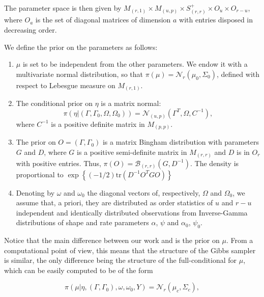 \documentclass[graybox]{svmult}
\begin{document}
The parameter space is then given by $M_{\left( r, 1 \right)} \times M_{\left( u, p \right)}\times S^+_{\left( r, r \right)} \times O_u \times O_{r -u} $, where $O_a$ is the set of diagonal matrices of dimension $a$ with entries disposed in decreasing order.

We define the prior on the parameters as follows:

\begin{enumerate}
\item $\mu$ is set to be independent from the other parameters. We endow it with a multivariate normal distribution, so that $\pi \left( \mu \right) = \mathcal{N}_r \left( \mu_0, \Sigma_0 \right)$, defined with respect to Lebesgue measure on $M_{\left( r, 1 \right)}$.
\item The conditional prior on $\eta$ is a matrix normal: $$\pi \left( \eta | \left( \Gamma, \Gamma_0, \Omega, \Omega_0 \right) \right) = \mathcal{N}_{\left( u, p \right)}\left( \Gamma^T, \Omega, C^{-1} \right),$$ where $C^{-1}$ is a positive definite matrix in $M_{\left( p, p \right)}$.
\item The prior on $O = \left( \Gamma, \Gamma_0 \right)$ is a matrix Bingham distribution with parameters $G$ and $D$, where $G$ is a positive semi-definite matrix in $M_{\left( r, r \right)}$ and $D$ is in $O_r$ with positive entries. Thus, $\pi \left( O \right) = \mathcal{B}_{\left( r, r \right)}\left( G, D^{-1} \right)$. The density is proportional to $\exp{\left\{ \left(-1/2\right) \mathrm{tr}\left( D^{-1}O^TGO\right) \right\}}$
\item Denoting by $\omega$ and $\omega_0$ the diagonal vectors of, respectively, $\Omega$ and $\Omega_0$, we assume that, a priori, they are distributed as order statistics of $u$ and $r - u$ independent and identically distributed observations from Inverse-Gamma distributions of shape and rate parameters $\alpha$, $\psi$ and $\alpha_0$, $\psi_0$.
\end{enumerate}

Notice that the main difference between our work and \cite{khareBayesianApproachEnvelope2017} is the prior on $\mu$. From a computational point of view, this means that the structure of the Gibbs sampler is similar, the only difference being the structure of the full-conditional for $\mu$, which can be easily computed to be of the form

\begin{equation}
  \label{eq:6}
  \pi \left( \mu | \eta, \left( \Gamma, \Gamma_0 \right), \omega, \omega_0, Y \right) = \mathcal{N}_r\left( \mu_{c}, \Sigma_{c} \right),
\end{equation}
\end{document}
